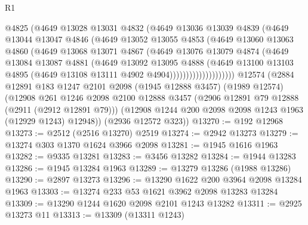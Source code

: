 \begin{lexlean}{R1}
\begin{coremodule}
                      @4825
                      (@4649
                        @13028
                        @13031
                        @4832
                        (@4649
                          @13036
                          @13039
                          @4839
                          (@4649
                            @13044
                            @13047
                            @4846
                            (@4649
                              @13052
                              @13055
                              @4853
                              (@4649
                                @13060
                                @13063
                                @4860
                                (@4649
                                  @13068
                                  @13071
                                  @4867
                                  (@4649
                                    @13076
                                    @13079
                                    @4874
                                    (@4649
                                      @13084
                                      @13087
                                      @4881
                                      (@4649
                                        @13092
                                        @13095
                                        @4888
                                        (@4649
                                          @13100
                                          @13103
                                          @4895
                                          (@4649 @13108 @13111 @4902 @4904))))))))))))))))))))
    @12574
    (@2884
      @12891
      @183
      @1247
      @2101
      @2098
      (@1945 @12888 @3457)
      (@1989 @12574)
      (@12908
        @261
        @1246
        @2098
        @2100
        @12888
        @3457
        (@2906 @12891 @79 @12888 (@2911 (@2912 @12891 @79)))
        (@12908 @1244 @200 @2098 @2098 @1243 @1963 (@12929 @1243) @12948))
      (@2936 @12572 @323))
@13270 := @192 @12968
@13273 := @2512 (@2516 @13270) @2519
@13274 := @2942 @13273
@13279 := @13274 @303 @1370 @1624 @3966 @2098
@13281 := @1945 @1616 @1963
@13282 := @9335 @13281
@13283 := @3456 @13282
@13284 := @1944 @13283
@13286 := @1945 @13284 @1963
@13289 := @13279 @13286 (@1988 @13286)
@13290 := @2897 @13273
@13296 := @13290 @1622 @200 @3964 @2098 @13284 @1963
@13303 := @13274 @233 @53 @1621 @3962 @2098 @13283 @13284
@13309 := @13290 @1244 @1620 @2098 @2101 @1243 @13282
@13311 := @2925 @13273 @11
@13313 := @13309 (@13311 @1243)

\end{coremodule}
\end{lexlean}
